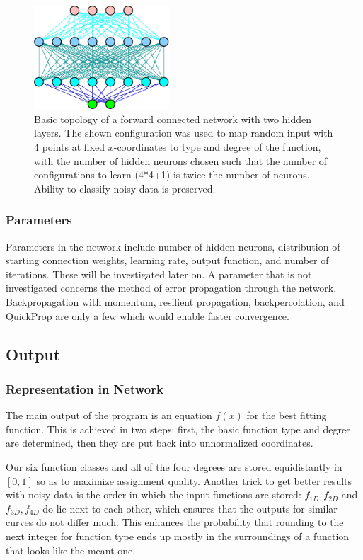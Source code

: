 \documentclass[useAMS,usenatbib]{mn2e}
\begin{document}
 \begin{figure}
   \begin{center}
     \includegraphics[width=0.45\textwidth]{fig/network_topology.eps}
   \end{center}
   \caption{\label{fig:network_topology}Basic topology of a forward
     connected network with two hidden layers. The shown configuration
     was used to map random input with 4 points at fixed
     $x$-coordinates to type and degree of the function, with the
     number of hidden neurons chosen such that the number of
     configurations to learn (4*4+1) is twice the number of
     neurons. Ability to classify noisy data is preserved.}
 \end{figure}
%
\subsubsection{Parameters}
Parameters in the network include number of hidden neurons,
distribution of starting connection weights, learning rate, output
function, and number of iterations. These will be investigated later
on. A parameter that is not investigated concerns the method of error
propagation through the network. Backpropagation with momentum,
resilient propagation, backpercolation, and QuickProp are only a few
which would enable faster convergence.

\subsection{Output}
\subsubsection{Representation in Network}
The main output of the program is an equation $f(x)$ for the best
fitting function. This is achieved in two steps: first, the basic
function type and degree are determined, then they are put back into
unnormalized coordinates.

Our six function classes and all of the four degrees are stored
equidistantly in $[0,1]$ so as to maximize assignment quality. Another
trick to get better results with noisy data is the order in which the
input functions are stored: $f_{1D},f_{2D}$ and $f_{3D},f_{4D}$ do lie
next to each other, which ensures that the outputs for similar curves
do not differ much. This enhances the probability that rounding to the
next integer for function type ends up mostly in the surroundings of a
function that looks like the meant one.
%
\end{document}
